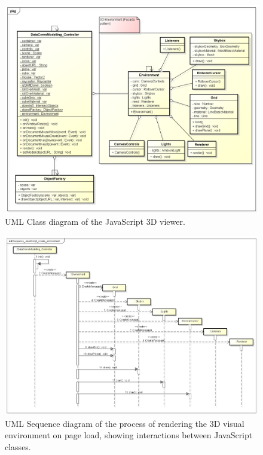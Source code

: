 \begin{figure}[H]
\centering
\includegraphics[width=5in]{Resources//Design_Diagrams//Class_ JavaScript Front-end.png}
\caption{UML Class diagram of the JavaScript 3D viewer.}
\label{}
\end{figure}

\begin{figure}[H]
\centering
\includegraphics[width=5in]{Resources//Design_Diagrams//Sequence_JavaScript_create_environment.png}
\caption{UML Sequence diagram of the process of rendering the 3D visual environment on page load, showing interactions between JavaScript classes.}
\label{}
\end{figure}

